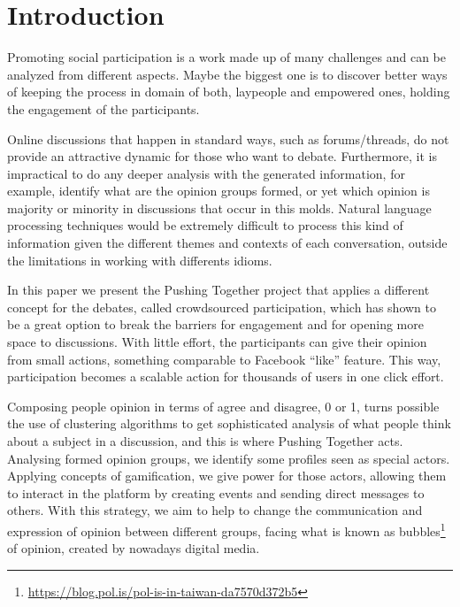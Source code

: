 \documentclass{llncs}
\begin{document}
\section{Introduction}
\label{sec:intro}
  Promoting social participation is a work made up of many challenges and can be
  analyzed from different aspects. Maybe the biggest one is to discover better
  ways of keeping the process in domain of both, laypeople and empowered ones,
  holding the engagement of the participants.

  Online discussions that happen in standard ways, such as forums/threads, do not
  provide an attractive dynamic for those who want to debate. Furthermore, it is
  impractical to do any deeper analysis with the generated information, for example,
  identify what are the opinion groups formed, or yet which opinion is majority
  or minority in discussions that occur in this molds. Natural language processing
  techniques would be extremely difficult to process this kind of information
  given the different themes and contexts of each conversation, outside the
  limitations in working with differents idioms.

  In this paper we present the Pushing Together project that applies a different concept for the debates,
  called crowdsourced participation, which has shown to be a great option to break the
  barriers for engagement and for opening more space to discussions. With little
  effort, the participants can give their opinion from small actions,
  something comparable to Facebook ``like'' feature. This way, participation becomes
  a scalable action for thousands of users in one click effort.

  Composing people opinion in terms of agree and disagree, 0 or 1, turns possible
  the use of clustering algorithms to get sophisticated analysis of what people
  think about a subject in a discussion, and this is where Pushing Together acts.
  Analysing formed opinion groups, we identify some profiles seen as special actors.
  Applying concepts of gamification, we give power for those actors, allowing
  them to interact in the platform by creating events and sending direct messages
  to others. With this strategy, we aim to help to change the communication and expression
  of opinion between different groups, facing what is known as
  bubbles\footnote{\url{https://blog.pol.is/pol-is-in-taiwan-da7570d372b5}} of
  opinion, created by nowadays digital media.

\end{document}

